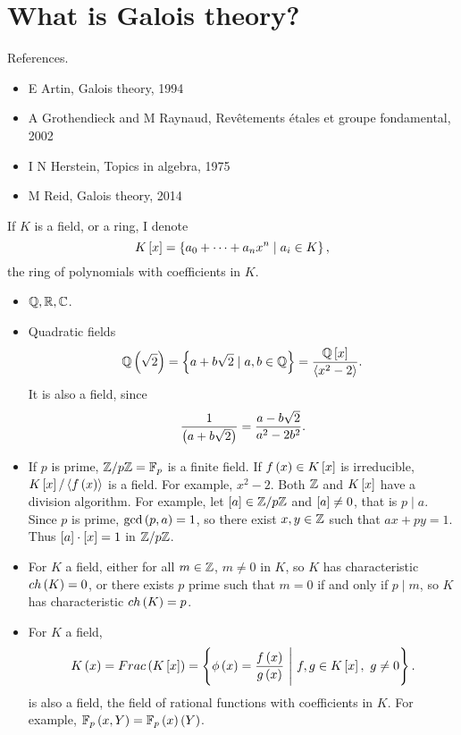\def\module{M3P11 Galois Theory}
\def\lecturer{Prof Alessio Corti}
\def\term{Spring 2019}

\def\thm{section}







\section{What is Galois theory?}


References.
\begin{itemize}
\item E Artin, Galois theory, 1994
\item A Grothendieck and M Raynaud, Rev\^etements \'etales et groupe fondamental, 2002
\item I N Herstein, Topics in algebra, 1975
\item M Reid, Galois theory, 2014
\end{itemize}

\begin{notation*}
If $ K $ is a field, or a ring, I denote
$$ K\sb{x} = \cb{a_0 + \dots + a_nx^n \mid a_i \in K}, $$
the ring of polynomials with coefficients in $ K $.
\end{notation*}

\begin{example*}
\hfill
\begin{itemize}
\item $ \Q, \R, \C $.
\item Quadratic fields
$$ \Q\rb{\sqrt{2}} = \cb{a + b\sqrt{2} \mid a, b \in \Q} = \dfrac{\Q\sb{x}}{\ab{x^2 - 2}}. $$
It is also a field, since
$$ \dfrac{1}{\rb{a + b\sqrt{2}}} = \dfrac{a - b\sqrt{2}}{a^2 - 2b^2}. $$
\item If $ p $ is prime, $ \Z / p\Z = \F_p $ is a finite field. If $ f\rb{x} \in K\sb{x} $ is irreducible, $ K\sb{x} / \ab{f\rb{x}} $ is a field. For example, $ x^2 - 2 $. Both $ \Z $ and $ K\sb{x} $ have a division algorithm. For example, let $ \sb{a} \in \Z / p\Z $ and $ \sb{a} \ne 0 $, that is $ p \mid a $. Since $ p $ is prime, $ \gcd\rb{p, a} = 1 $, so there exist $ x, y \in \Z $ such that $ ax + py = 1 $. Thus $ \sb{a} \cdot \sb{x} = 1 $ in $ \Z / p\Z $.
\item For $ K $ a field, either for all $ m \in \Z $, $ m \ne 0 $ in $ K $, so $ K $ has characteristic $ ch\rb{K} = 0 $, or there exists $ p $ prime such that $ m = 0 $ if and only if $ p \mid m $, so $ K $ has characteristic $ ch\rb{K} = p $.
\item For $ K $ a field,
$$ K\rb{x} = Frac\rb{K\sb{x}} = \cb{\phi\rb{x} = \dfrac{f\rb{x}}{g\rb{x}} \ \Bigg| \ f, g \in K\sb{x}, \ g \ne 0}. $$
is also a field, the field of rational functions with coefficients in $ K $. For example, $ \F_p\rb{x, Y} = \F_p\rb{x}\rb{Y} $.
\end{itemize}
\end{example*}

